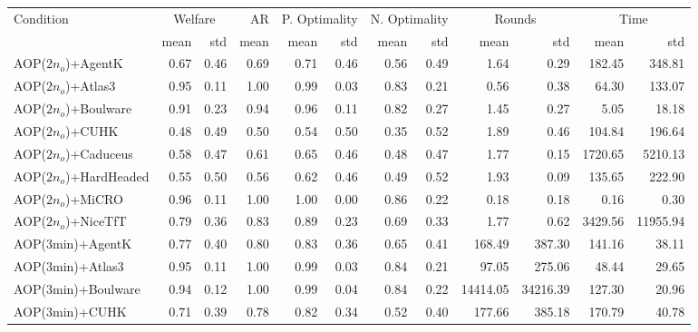 \begin{tabular}{l|rr|r|rr|rr|rr|rr}
\toprule
                Condition & \multicolumn{2}{|c|}{Welfare} &   AR & \multicolumn{2}{c|}{P. Optimality} & \multicolumn{2}{c|}{N. Optimality} & \multicolumn{2}{c|}{Rounds} & \multicolumn{2}{c|}{Time} \\
                          &    mean &  std & mean &          mean &  std &          mean &  std &     mean &      std &    mean &      std \\
\midrule
      AOP($2 n_o$)+AgentK &    0.67 & 0.46 & 0.69 &          0.71 & 0.46 &          0.56 & 0.49 &     1.64 &     0.29 &  182.45 &   348.81 \\
      AOP($2 n_o$)+Atlas3 &    0.95 & 0.11 & 1.00 &          0.99 & 0.03 &          0.83 & 0.21 &     0.56 &     0.38 &   64.30 &   133.07 \\
    AOP($2 n_o$)+Boulware &    0.91 & 0.23 & 0.94 &          0.96 & 0.11 &          0.82 & 0.27 &     1.45 &     0.27 &    5.05 &    18.18 \\
        AOP($2 n_o$)+CUHK &    0.48 & 0.49 & 0.50 &          0.54 & 0.50 &          0.35 & 0.52 &     1.89 &     0.46 &  104.84 &   196.64 \\
    AOP($2 n_o$)+Caduceus &    0.58 & 0.47 & 0.61 &          0.65 & 0.46 &          0.48 & 0.47 &     1.77 &     0.15 & 1720.65 &  5210.13 \\
  AOP($2 n_o$)+HardHeaded &    0.55 & 0.50 & 0.56 &          0.62 & 0.46 &          0.49 & 0.52 &     1.93 &     0.09 &  135.65 &   222.90 \\
       AOP($2 n_o$)+MiCRO &    0.96 & 0.11 & 1.00 &          1.00 & 0.00 &          0.86 & 0.22 &     0.18 &     0.18 &    0.16 &     0.30 \\
     AOP($2 n_o$)+NiceTfT &    0.79 & 0.36 & 0.83 &          0.89 & 0.23 &          0.69 & 0.33 &     1.77 &     0.62 & 3429.56 & 11955.94 \\
         AOP(3min)+AgentK &    0.77 & 0.40 & 0.80 &          0.83 & 0.36 &          0.65 & 0.41 &   168.49 &   387.30 &  141.16 &    38.11 \\
         AOP(3min)+Atlas3 &    0.95 & 0.11 & 1.00 &          0.99 & 0.03 &          0.84 & 0.21 &    97.05 &   275.06 &   48.44 &    29.65 \\
       AOP(3min)+Boulware &    0.94 & 0.12 & 1.00 &          0.99 & 0.04 &          0.84 & 0.22 & 14414.05 & 34216.39 &  127.30 &    20.96 \\
           AOP(3min)+CUHK &    0.71 & 0.39 & 0.78 &          0.82 & 0.34 &          0.52 & 0.40 &   177.66 &   385.18 &  170.79 &    40.78 \\

\end{tabular}
